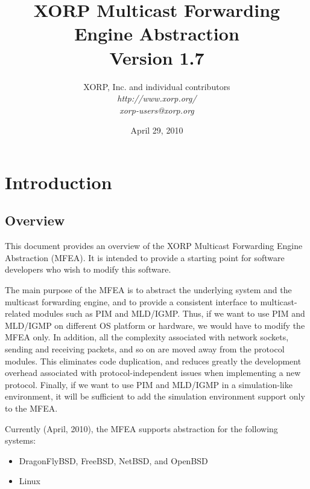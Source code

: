 \documentclass[11pt]{article}
\begin{document}
\title{XORP Multicast Forwarding Engine Abstraction \\
\vspace{1ex}
Version 1.7}
\author{ XORP, Inc. and individual contributors		\\
         {\it http://www.xorp.org/}			\\
	 {\it xorp-users@xorp.org}
}
\date{April 29, 2010}

\maketitle


\section{Introduction}


\subsection{Overview}

This document provides an overview of the XORP Multicast Forwarding
Engine Abstraction (MFEA). It is intended to provide a starting point
for software developers who wish to modify this software.

The main purpose of the MFEA is to abstract the underlying system and
the multicast forwarding engine, and to provide a consistent interface
to multicast-related modules such as PIM and MLD/IGMP. Thus, if we want
to use PIM and MLD/IGMP on different OS platform or hardware, we
would have to modify the MFEA only. In addition, all the
complexity associated with network sockets, sending and receiving
packets, and so on are moved away from the protocol modules.
This eliminates code duplication, and reduces greatly the
development overhead associated with protocol-independent
issues when implementing a new protocol. Finally, if we want to use
PIM and MLD/IGMP in a simulation-like environment, it will be sufficient
to add the simulation environment support only to the MFEA.

Currently (April, 2010), the MFEA supports abstraction for
the following systems:

\begin{itemize}
  \item DragonFlyBSD, FreeBSD, NetBSD, and OpenBSD
  \item Linux
\end{itemize}
\end{document}
